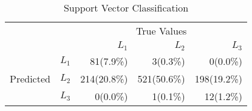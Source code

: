 \begin{table}
\centering
  \caption{Support Vector Classification}
  \begin{tabular}{rrrrr}
    \toprule
    & &\multicolumn{3}{c}{True Values}\\
    & & ${L_1}$ & ${L_2}$ & ${L_3}$ \\
    \multirow{3}{*}{Predicted} & ${L_1}$ & 81(7.9\%) & 3(0.3\%) & 0(0.0\%) \\
    & ${L_2}$ & 214(20.8\%) & 521(50.6\%) & 198(19.2\%) \\
    & ${L_3}$ & 0(0.0\%) & 1(0.1\%) & 12(1.2\%) \\\bottomrule
  \end{tabular}
\end{table}
